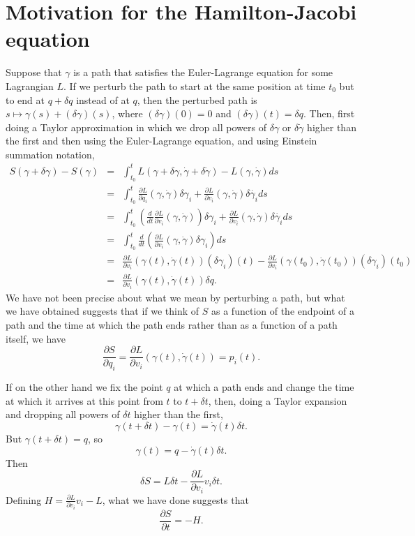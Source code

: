 \documentclass{article}
\theoremstyle{definition}
\begin{document}
\section{Motivation for the Hamilton-Jacobi equation}
Suppose that $\gamma$ is a path that satisfies the Euler-Lagrange equation for some Lagrangian $L$. If we perturb the path to start at the same position at time $t_0$ but to end  at
$q+\delta q$ instead of at $q$, then the perturbed path is $s \mapsto \gamma(s)+(\delta \gamma)(s)$, where $(\delta \gamma)(0)=0$ and $(\delta \gamma)(t)=\delta q$.  
Then, first doing a Taylor approximation in which we drop all powers of $\delta \gamma$ or $\delta \dot{\gamma}$ higher than the first and then using the Euler-Lagrange
equation, and
using Einstein summation notation, 
\begin{eqnarray*}
S(\gamma+\delta \gamma)-S(\gamma)&=&\int_{t_0}^t L(\gamma+\delta \gamma,\dot{\gamma}+\delta \dot{\gamma}) - L(\gamma,\dot{\gamma}) ds\\
&=&\int_{t_0}^t \frac{\partial L}{\partial q_i}(\gamma,\dot{\gamma}) \delta \gamma_i + \frac{\partial L}{\partial v_i}(\gamma,\dot{\gamma}) \delta \dot{\gamma_i} ds\\
&=&\int_{t_0}^t \left( \frac{d}{dt} \frac{\partial L}{\partial v_i}(\gamma,\dot{\gamma}) \right) \delta \gamma_i + \frac{\partial L}{\partial v_i}(\gamma,\dot{\gamma}) \delta \dot{\gamma_i} ds\\
&=&\int_{t_0}^t \frac{d}{dt} \left(  \frac{\partial L}{\partial v_i}(\gamma,\dot{\gamma}) \delta \gamma_i \right) ds\\
&=&\frac{\partial L}{\partial v_i}(\gamma(t),\dot{\gamma}(t)) (\delta \gamma_i)(t) - \frac{\partial L}{\partial v_i}(\gamma(t_0),\dot{\gamma}(t_0)) (\delta \gamma_i)(t_0)\\
&=&\frac{\partial L}{\partial v_i}(\gamma(t),\dot{\gamma}(t)) \delta q.
\end{eqnarray*}
We have not been precise about what we mean by perturbing a path, but what we have obtained suggests that if
we think of $S$ as a function of the endpoint of a path and the time at which the path ends rather than as a function of a path
itself, we have
\[
\frac{\partial S}{\partial q_i} = \frac{\partial L}{\partial v_i}(\gamma(t),\dot{\gamma}(t)) = p_i(t).
\]

If on the other hand we fix the point $q$ at which a path ends and change the time at which it arrives at this point 
from $t$ to $t+\delta t$, then, doing a Taylor expansion and dropping all
powers of $\delta t$ higher than the first,
\[
\gamma(t+\delta t)-\gamma(t) = \dot{\gamma}(t)\delta t.
\]
But $\gamma(t+\delta t)=q$, so
\[
\gamma(t) = q-  \dot{\gamma}(t)\delta t.
\]
Then
\[
\delta S = L \delta t -\frac{\partial L}{\partial v_i} v_i \delta t.
\]
Defining $H=\frac{\partial L}{\partial v_i} v_i - L$, what we have done suggests that 
\[
\frac{\partial S}{\partial t} = -H.
\]
\end{document}
